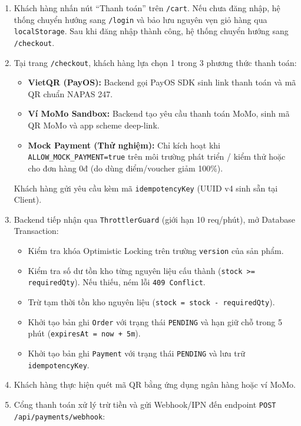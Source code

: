 \documentclass[11pt,a4paper]{article}
\begin{document}
\begin{enumerate}[leftmargin=*,resume]
    \item Khách hàng nhấn nút “Thanh toán” trên \texttt{/cart}. Nếu chưa đăng nhập, hệ thống chuyển hướng sang \texttt{/login} và bảo lưu nguyên vẹn giỏ hàng qua \texttt{localStorage}. Sau khi đăng nhập thành công, hệ thống chuyển hướng sang \texttt{/checkout}.
    \item Tại trang \texttt{/checkout}, khách hàng lựa chọn 1 trong 3 phương thức thanh toán:
    \begin{itemize}[leftmargin=*]
        \item \textbf{VietQR (PayOS):} Backend gọi PayOS SDK sinh link thanh toán và mã QR chuẩn NAPAS 247.
        \item \textbf{Ví MoMo Sandbox:} Backend tạo yêu cầu thanh toán MoMo, sinh mã QR MoMo và app scheme deep-link.
        \item \textbf{Mock Payment (Thử nghiệm):} Chỉ kích hoạt khi \texttt{ALLOW\_MOCK\_PAYMENT=true} trên môi trường phát triển / kiểm thử hoặc cho đơn hàng 0đ (do dùng điểm/voucher giảm 100\%).
    \end{itemize}
    Khách hàng gửi yêu cầu kèm mã \texttt{idempotencyKey} (UUID v4 sinh sẵn tại Client).
    \item Backend tiếp nhận qua \texttt{ThrottlerGuard} (giới hạn 10 req/phút), mở Database Transaction:
    \begin{itemize}[leftmargin=*]
        \item Kiểm tra khóa Optimistic Locking trên trường \texttt{version} của sản phẩm.
        \item Kiểm tra số dư tồn kho từng nguyên liệu cấu thành (\texttt{stock >= requiredQty}). Nếu thiếu, ném lỗi \texttt{409 Conflict}.
        \item Trừ tạm thời tồn kho nguyên liệu (\texttt{stock = stock - requiredQty}).
        \item Khởi tạo bản ghi \texttt{Order} với trạng thái \texttt{PENDING} và hạn giữ chỗ trong 5 phút (\texttt{expiresAt = now + 5m}).
        \item Khởi tạo bản ghi \texttt{Payment} với trạng thái \texttt{PENDING} và lưu trữ \texttt{idempotencyKey}.
    \end{itemize}
    \item Khách hàng thực hiện quét mã QR bằng ứng dụng ngân hàng hoặc ví MoMo.
    \item Cổng thanh toán xử lý trừ tiền và gửi Webhook/IPN đến endpoint \texttt{POST /api/payments/webhook}:

\end{enumerate}
\end{document}
